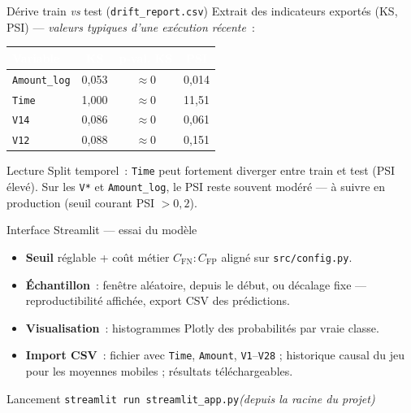 \documentclass[aspectratio=169,11pt]{beamer}
\begin{document}
\begin{frame}{Dérive train \textit{vs} test (\texttt{drift\_report.csv})}
  \small
  Extrait des indicateurs exportés (KS, PSI) — \textit{valeurs typiques d’une exécution récente}~:
  \vspace{0.4em}
  \begin{center}
    \renewcommand{\arraystretch}{1.15}
    \begin{tabular}{@{}lccc@{}}
      \toprule
      \rowcolor{MLDeep!85}
      \textcolor{white}{\textbf{Variable}} &
      \textcolor{white}{\textbf{KS}} &
      \textcolor{white}{\textbf{p-val. KS}} &
      \textcolor{white}{\textbf{PSI}} \\
      \midrule
      \texttt{Amount\_log} & 0,053 & $\approx 0$ & 0,014 \\
      \texttt{Time}        & 1,000 & $\approx 0$ & 11,51 \\
      \texttt{V14}         & 0,086 & $\approx 0$ & 0,061 \\
      \texttt{V12}         & 0,088 & $\approx 0$ & 0,151 \\
      \bottomrule
    \end{tabular}
  \end{center}
  \vspace{0.35em}
  \begin{alertblock}{Lecture}
    \small Split temporel~: \texttt{Time} peut fortement diverger entre train et test (PSI élevé). Sur les \texttt{V*} et \texttt{Amount\_log}, le PSI reste souvent modéré — à suivre en production (seuil courant PSI $>0{,}2$).
  \end{alertblock}
\end{frame}

\begin{frame}{Interface Streamlit — essai du modèle}
  \begin{itemize}
    \item \textbf{Seuil} réglable + coût métier $C_{\mathrm{FN}}{:}C_{\mathrm{FP}}$ aligné sur \texttt{src/config.py}.
    \item \textbf{Échantillon}~: fenêtre aléatoire, depuis le début, ou décalage fixe — reproductibilité affichée, export CSV des prédictions.
    \item \textbf{Visualisation}~: histogrammes Plotly des probabilités par vraie classe.
    \item \textbf{Import CSV}~: fichier avec \texttt{Time}, \texttt{Amount}, \texttt{V1}--\texttt{V28} ; historique causal du jeu pour les moyennes mobiles ; résultats téléchargeables.
  \end{itemize}
  \vspace{0.5em}
  \begin{block}{Lancement}
    \centering\texttt{streamlit run streamlit\_app.py}\quad\textit{(depuis la racine du projet)}
  \end{block}
\end{frame}
\end{document}
